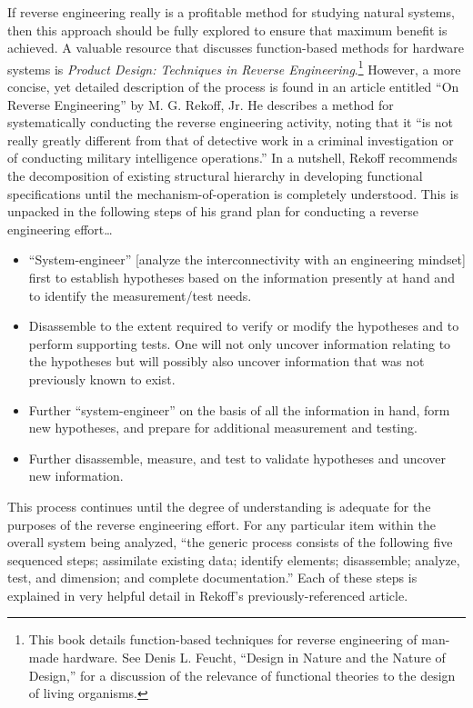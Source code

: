 If reverse engineering really is a profitable method for studying
natural systems, then this approach should be fully explored to ensure
that maximum benefit is achieved. A valuable resource that discusses
function-based methods for hardware systems is \textit{Product Design:
Techniques in Reverse Engineering}.\citep{ottowood2001}\footnote{
This book details function-based
techniques for reverse engineering of man-made hardware. See Denis L.
Feucht, ``Design in Nature and the Nature of Design,''\citep{feucht1999} 
for a discussion of the relevance of
functional theories to the design of living organisms.
} However, a more
concise, yet detailed description of the process is found in an article
entitled ``On Reverse Engineering'' by M. G. Rekoff,
Jr.\citep{rekoff1985} He describes a method for systematically
conducting the reverse engineering activity, noting that it ``is not
really greatly different from that of detective work in a criminal
investigation or of conducting military intelligence
operations.''\citep[][pg. 245]{rekoff1985} In a nutshell, Rekoff recommends the
decomposition of existing structural hierarchy in developing functional
specifications until the mechanism-of-operation is completely
understood. This is unpacked in the following steps of his grand plan
for conducting a reverse engineering effort{\ldots}

\begin{itemize}
\item 
``System-engineer'' [analyze the interconnectivity with an engineering
mindset] first to establish hypotheses based on the information
presently at hand and to identify the measurement/test needs.
\item 
Disassemble to the extent required to verify or modify the hypotheses
and to perform supporting tests. One will not only uncover information
relating to the hypotheses but will possibly also uncover information
that was not previously known to exist.
\item 
Further ``system-engineer'' on the basis of all the information in hand,
form new hypotheses, and prepare for additional measurement and
testing.
\item 
Further disassemble, measure, and test to validate hypotheses and
uncover new information.
\end{itemize}

This process continues until the degree of understanding is adequate for
the purposes of the reverse engineering effort. For any particular item
within the overall system being analyzed, “the generic process consists
of the following five sequenced steps; assimilate existing data;
identify elements; disassemble; analyze, test, and dimension; and
complete documentation.” Each of these steps is explained in very
helpful detail in Rekoff’s previously-referenced article.

